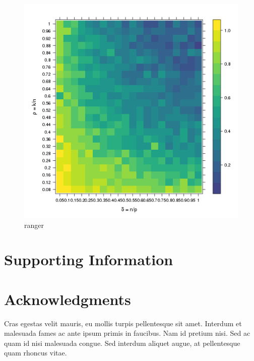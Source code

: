\documentclass[10pt,letterpaper]{article}
\begin{document}
\begin{figure}[tbhp]
\includegraphics[totalheight=6cm]{./figs/ranger.png}
\caption{ ranger}
\label{figure:ranger.png}
\end{figure}

\clearpage
\section{Supporting Information}



\section*{Acknowledgments}

Cras egestas velit mauris, eu mollis turpis pellentesque sit
amet. Interdum et malesuada fames ac ante ipsum primis in
faucibus. Nam id pretium nisi. Sed ac quam id nisi malesuada
congue. Sed interdum aliquet augue, at pellentesque quam rhoncus
vitae.

\nolinenumbers


\end{document}

